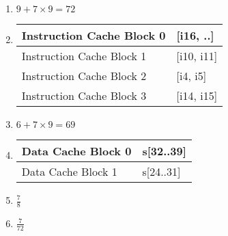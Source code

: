 \documentclass[12pt, a4paper]{article}
\begin{document}
\begin{enumerate}[Q\arabic*.]
\begin{enumerate}[(\alph*.)]
      \item $9 + 7 \times 9 = 72$

      \item 
        \begin{tabular}{|l|l|}
        \hline
        Instruction Cache Block 0 & [i16, ..] \\
        \hline
        Instruction Cache Block 1 & [i10, i11] \\
        \hline
        Instruction Cache Block 2 & [i4, i5] \\
        \hline
        Instruction Cache Block 3 & [i14, i15] \\
        \hline
        \end{tabular}

      \item $6 + 7 \times 9 = 69$

      \item 
        \begin{tabular}{|l|l|}
        \hline
        Data Cache Block 0 & s[32..39] \\
        \hline
        Data Cache Block 1 & s[24..31] \\
        \hline
        \end{tabular}

      \item $\frac{7}{8}$

      \item $\frac{7}{72}$
    \end{enumerate}

\end{enumerate}
\end{document}
